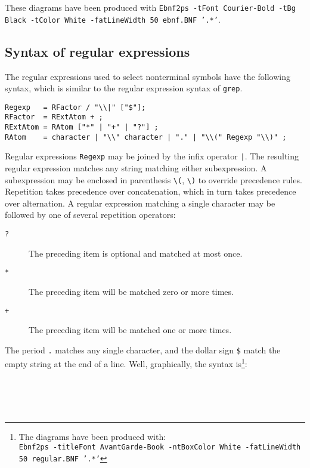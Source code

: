 \documentclass{article}
\begin{document}
\noindent These diagrams have been produced with \texttt{Ebnf2ps
  -tFont Courier-Bold -tBg Black -tColor White -fatLineWidth 50
  ebnf.BNF '.*'}.


\subsection{Syntax of regular expressions}
\label{sec:regular}

The regular expressions used to select nonterminal symbols have the following
syntax, which is similar to the regular expression syntax of \texttt{grep}.

\begin{verbatim}
Regexp   = RFactor / "\\|" ["$"];
RFactor  = RExtAtom + ;
RExtAtom = RAtom ["*" | "+" | "?"] ;
RAtom    = character | "\\" character | "." | "\\(" Regexp "\\)" ;
\end{verbatim}

Regular expressions \texttt{Regexp} may be joined by the infix
operator \texttt{|}. The resulting regular expression matches any
string matching either subexpression. A subexpression may be enclosed
in parenthesis \verb|\(|, \verb|\)| to override precedence rules.
Repetition takes precedence over concatenation, which in turn takes
precedence over alternation. A regular expression matching a single
character may be followed by one of several repetition operators:

\begin{description}
\item[\texttt{?}] The preceding item is optional and matched at most once.
\item[\texttt{*}] The preceding item will be matched zero or more times.
\item[\texttt{+}] The preceding item will be matched one or more times.
\end{description}
The period \texttt{.} matches any single character, and the dollar sign
\verb|$| match the empty string at the end of a line. Well, graphically,
the syntax is\footnote{The diagrams have been produced with:\\
\texttt{Ebnf2ps -titleFont AvantGarde-Book -ntBoxColor White -fatLineWidth
50 regular.BNF '.*'}}:

\begin{flushleft}
  \leavevmode{}
  \\
  \leavevmode{}
  \\
  \leavevmode{}
  \\
  \leavevmode{}
\end{flushleft}
\end{document}
